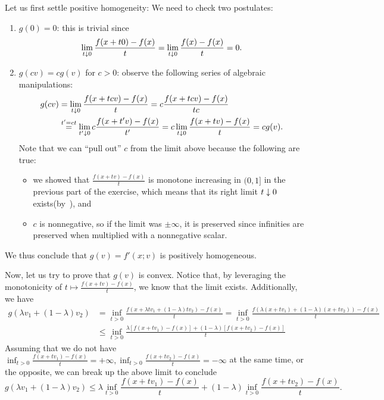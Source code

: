 \documentclass[10pt]{article}
\begin{document}
\begin{Exercise}
    Let us first settle positive homogeneity:  We need to check two postulates:
    \begin{enumerate}
		\item $g(0) = 0$: this is trivial since
			\[
				\lim_{t \downarrow 0} \frac{f(x + t 0) - f(x)}{t} =
				\lim_{t \downarrow 0} \frac{f(x) - f(x)}{t} = 0.
			\]
		\item $g(cv) = c g(v)$ for $c > 0$: observe the following series of
        algebraic manipulations:
        \begin{align*}
            g(cv) &= \lim_{t \downarrow 0} \frac{f(x + t cv) - f(x)}{t} =
                c \frac{f(x + tcv) - f(x)}{t c} \\
                & \overset{t' = ct}{=}
                \lim_{t' \downarrow 0} c \frac{f(x + t'v) - f(x)}{t'} =
                c \lim_{t \downarrow 0} \frac{f(x + tv) - f(x)}{t} = c g(v).
        \end{align*}
        Note that we can ``pull out'' $c$ from the limit above because the
        following are true:
        \begin{itemize}
        \item we showed that $\frac{f(x+tv) - f(x)}{t}$ is monotone increasing
        in $(0, 1]$ in the previous part of the exercise, which means that its
        right limit $t \downarrow 0$ exists(by~\cite[Theorem 4.29]{Rudin76}), and
        \item $c$ is nonnegative, so if the limit was $\pm \infty$, it is
        preserved since infinities are preserved when multiplied with a
        nonnegative scalar.
        \end{itemize}
	\end{enumerate}
    We thus conclude that $g(v) = f'(x; v)$ is positively homogeneous.

    Now, let us try to prove that $g(v)$ is convex. Notice that, by leveraging
    the monotonicity of $t \mapsto \frac{f(x + tv) - f(x)}{t}$, we know that the
    limit exists. Additionally, we have
    \begin{align*}
        g(\lambda v_1 + (1 - \lambda)v_2) &= \inf_{t > 0}
            \frac{f(x + \lambda t v_1 + (1 - \lambda) t v_2) - f(x)}{t} =
            \inf_{t > 0}
            \frac{f(\lambda (x + tv_1) + (1 - \lambda) (x + tv_2)) - f(x)}{t}
            \\
            &\leq \inf_{t > 0} \frac{\lambda [f(x + tv_1) - f(x)]
            + (1 - \lambda) [f(x + tv_2) - f(x)]}{t}
    \end{align*}
    Assuming that we do not have
    $\inf_{t > 0} \frac{f(x + tv_1) - f(x)}{t} = +\infty, \inf_{t > 0}
        \frac{f(x + tv_2) - f(x)}{t} = -\infty$ at the same time, or the
        opposite, we can break up the above limit to conclude
    \[
        g(\lambda v_1 + (1 - \lambda) v_2) \leq
        \lambda \inf_{t > 0} \frac{f(x + tv_1) - f(x)}{t} +
        (1 - \lambda) \inf_{t > 0} \frac{f(x + tv_2) - f(x)}{t}.
    \]


\end{Exercise}
\end{document}
